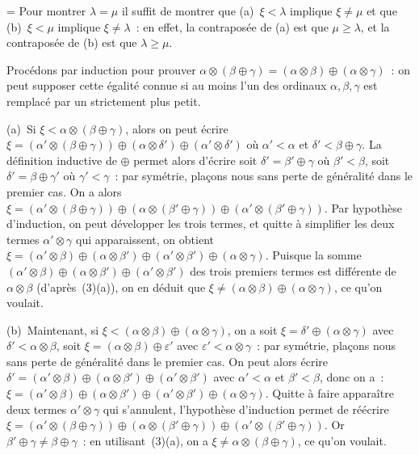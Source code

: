 \documentclass[12pt,a4paper]{article}
\theoremstyle{definition}
\newif\ifcorrige
\newenvironment{corrige}%
{\ifcorrige\relax\else\setbox0=\vbox\bgroup\fi%
\smallbreak\noindent{\underbar{\textit{Corrigé.}}\quad}}
{{\hbox{}\nobreak\hfill\checkmark}%
\ifcorrige\relax\else\egroup\fi\par}
\begin{document}
\begin{corrige}
Pour montrer $\lambda = \mu$ il suffit de montrer que
(a) $\xi<\lambda$ implique $\xi\neq\mu$ et que (b) $\xi<\mu$ implique
$\xi\neq\lambda$ : en effet, la contraposée de (a) est que
$\mu\geq\lambda$, et la contraposée de (b) est que $\lambda\geq\mu$.

Procédons par induction pour prouver $\alpha \otimes
(\beta\oplus\gamma) = (\alpha\otimes\beta) \oplus
(\alpha\otimes\gamma)$ : on peut supposer cette égalité connue si au
moins l'un des ordinaux $\alpha,\beta,\gamma$ est remplacé par un
strictement plus petit.

(a) Si $\xi < \alpha \otimes (\beta\oplus\gamma)$, alors on peut
écrire $\xi = (\alpha'\otimes(\beta\oplus\gamma)) \oplus
(\alpha\otimes\delta') \oplus (\alpha'\otimes\delta')$ où
$\alpha'<\alpha$ et $\delta' < \beta\oplus\gamma$.  La définition
inductive de $\oplus$ permet alors d'écrire soit $\delta' =
\beta'\oplus\gamma$ où $\beta'<\beta$, soit $\delta' =
\beta\oplus\gamma'$ où $\gamma'<\gamma$ : par symétrie, plaçons nous
sans perte de généralité dans le premier cas.  On a alors $\xi =
(\alpha'\otimes (\beta\oplus\gamma)) \oplus (\alpha\otimes
(\beta'\oplus\gamma)) \oplus (\alpha'\otimes (\beta'\oplus\gamma))$.
Par hypothèse d'induction, on peut développer les trois termes, et
quitte à simplifier les deux termes $\alpha'\otimes\gamma$ qui
apparaissent, on obtient $\xi = (\alpha'\otimes\beta) \oplus
(\alpha\otimes\beta') \oplus (\alpha'\otimes\beta') \oplus
(\alpha\otimes\gamma)$.  Puisque la somme $(\alpha'\otimes\beta)
\oplus (\alpha\otimes\beta') \oplus (\alpha'\otimes\beta')$ des trois
premiers termes est différente de $\alpha\otimes\beta$
(d'après (3)(a)), on en déduit que $\xi \neq (\alpha\otimes\beta)
\oplus (\alpha\otimes\gamma)$, ce qu'on voulait.

(b) Maintenant, si $\xi < (\alpha\otimes\beta) \oplus
(\alpha\otimes\gamma)$, on a soit $\xi = \delta' \oplus
(\alpha\otimes\gamma)$ avec $\delta' < \alpha\otimes\beta$, soit $\xi
= (\alpha\otimes\beta) \oplus \varepsilon'$ avec $\varepsilon' <
\alpha\otimes\gamma$ : par symétrie, plaçons nous sans perte de
généralité dans le premier cas.  On peut alors écrire $\delta' =
(\alpha'\otimes\beta) \oplus (\alpha\otimes\beta') \oplus
(\alpha'\otimes\beta')$ avec $\alpha'<\alpha$ et $\beta'<\beta$, donc
on a : $\xi = (\alpha'\otimes\beta) \oplus (\alpha\otimes\beta')
\oplus (\alpha'\otimes\beta') \oplus (\alpha\otimes\gamma)$.  Quitte à
faire apparaître deux termes $\alpha'\otimes\gamma$ qui s'annulent,
l'hypothèse d'induction permet de réécrire $\xi = (\alpha'\otimes
(\beta\oplus\gamma)) \oplus (\alpha\otimes (\beta'\oplus\gamma))
\oplus (\alpha'\otimes (\beta'\oplus\gamma))$.  Or $\beta'\oplus\gamma
\neq \beta\oplus\gamma$ : en utilisant (3)(a), on a $\xi \neq \alpha
\otimes (\beta\oplus\gamma)$, ce qu'on voulait.
\end{corrige}
\end{document}
